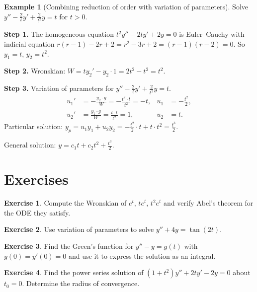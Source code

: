 \documentclass[12pt,a4paper,openany]{book}
\theoremstyle{definition}
\newtheorem{example}[definition]{Example}
\newtheorem{exercise}{Exercise}[chapter]
\theoremstyle{plain}
\theoremstyle{remark}
\begin{document}
\begin{example}[Combining reduction of order with variation of parameters]%
\label{ex:combined-methods}
Solve $y''-\frac{2}{t}y'+\frac{2}{t^2}y=t$ for $t>0$.

\textbf{Step 1.}  The homogeneous equation $t^2y''-2ty'+2y=0$ is
Euler--Cauchy with indicial equation $r(r-1)-2r+2=r^2-3r+2=(r-1)(r-2)=0$.
So $y_1=t$, $y_2=t^2$.

\textbf{Step 2.}  Wronskian: $W=ty_2'-y_2\cdot 1 = 2t^2-t^2=t^2$.

\textbf{Step 3.}  Variation of parameters for $y''-\frac{2}{t}y'+\frac{2}{t^2}y=t$.
\begin{align*}
  u_1' &= -\frac{y_2\cdot g}{W} = -\frac{t^2\cdot t}{t^2} = -t,
  & u_1 &= -\frac{t^2}{2}, \\
  u_2' &= \frac{y_1\cdot g}{W} = \frac{t\cdot t}{t^2} = 1,
  & u_2 &= t.
\end{align*}
Particular solution:
$y_p = u_1 y_1 + u_2 y_2 = -\frac{t^2}{2}\cdot t + t\cdot t^2
= \frac{t^3}{2}$.

General solution: $y = c_1 t + c_2 t^2 + \frac{t^3}{2}$.
\end{example}

\section{Exercises}\label{sec:methods-exercises}

\begin{exercise}\label{exo:meth-1}
Compute the Wronskian of $e^t,\,te^t,\,t^2e^t$ and verify Abel's
theorem for the ODE they satisfy.
\end{exercise}

\begin{exercise}\label{exo:meth-2}
Use variation of parameters to solve $y''+4y=\tan(2t)$.
\end{exercise}

\begin{exercise}\label{exo:meth-3}
Find the Green's function for $y''-y=g(t)$ with $y(0)=y'(0)=0$
and use it to express the solution as an integral.
\end{exercise}

\begin{exercise}\label{exo:meth-4}
Find the power series solution of $(1+t^2)y''+2ty'-2y=0$ about $t_0=0$.
Determine the radius of convergence.
\end{exercise}
\end{document}
